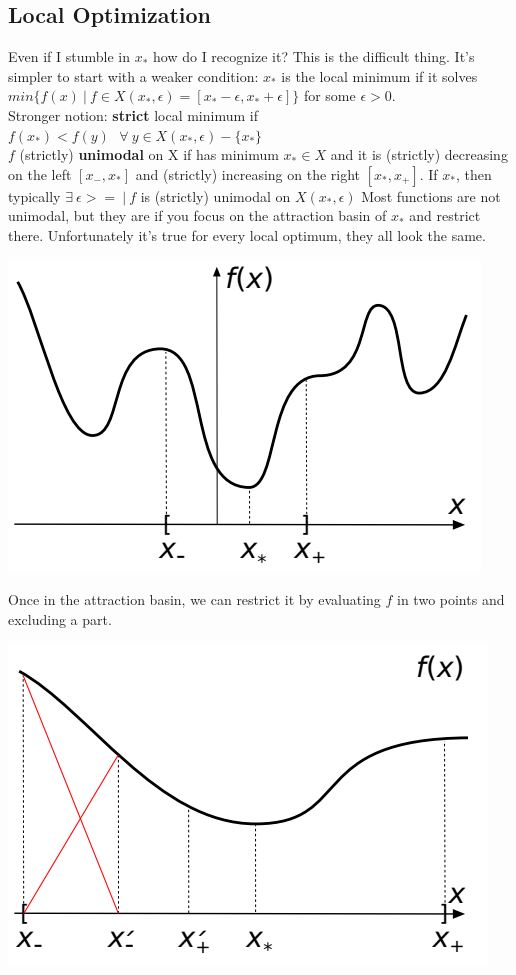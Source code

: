 \documentclass[10pt]{report}
\begin{document}
\subsection{Local Optimization} Even if I stumble in $x_*$ how do I recognize it? This is the difficult thing. It's simpler to start with a weaker condition: $x_*$ is the local minimum if it solves $min\{f(x)\:|\:f\in X(x_*, \epsilon) = [x_* - \epsilon, x_* + \epsilon]\}$ for some $\epsilon > 0$.\\
Stronger notion: \textbf{strict} local minimum if $f(x_*) < f(y)\:\:\:\forall\:y\in X(x_*,\epsilon) - \{x_*\}$\\
$f$ (strictly) \textbf{unimodal} on X if has minimum $x_* \in X$ and it is (strictly) decreasing on the left $[x_-, x_*]$ and (strictly) increasing on the right $[x_*, x_+]$. If $x_*$, then typically $\exists\:\epsilon>=\:|\:f$ is (strictly) unimodal on $X(x_*,\epsilon)$
Most functions are not unimodal, but they are if you focus on the attraction basin of $x_*$ and restrict there. Unfortunately it's true for every local optimum, they all look the same.
\begin{center}
	\includegraphics[scale=0.5]{5.png}
\end{center}
Once in the attraction basin, we can restrict it by evaluating $f$ in two points and excluding a part.
\begin{center}
	\includegraphics[scale=0.5]{6.png}
\end{center}
\end{document}
